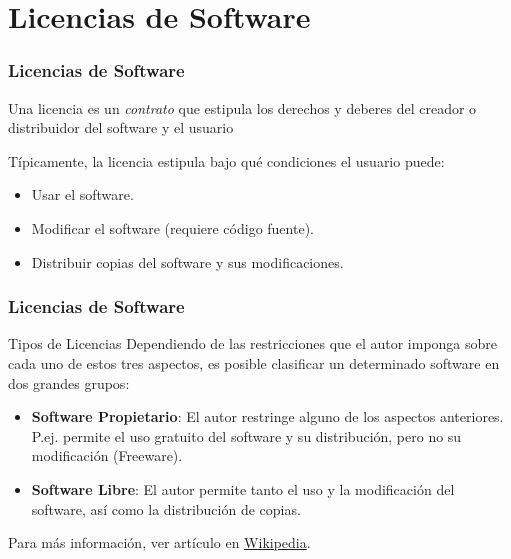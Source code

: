 \documentclass[aspectratio=169]{beamer}
\begin{document}
\section{Licencias de Software}
\begin{frame}[fragile]\frametitle{Licencias de Software}
\begin{block}{}
Una licencia es un \textit{contrato} que estipula los derechos y deberes del creador o distribuidor del software y el usuario
\end{block}
\begin{block}{}
Típicamente, la licencia estipula bajo qué condiciones el usuario puede:
\begin{itemize}
\item Usar el software.
\item Modificar el software (requiere código fuente).
\item Distribuir copias del software y sus modificaciones.
\end{itemize}
\end{block}
\end{frame}

\begin{frame}
\frametitle{Licencias de Software}
\begin{block}{Tipos de Licencias}
Dependiendo de las restricciones que el autor imponga sobre cada uno de estos tres aspectos, es posible clasificar un determinado software en dos grandes grupos:
\begin{itemize}
\item \textbf{Software Propietario}: El autor restringe alguno de los aspectos anteriores. P.ej. permite el uso gratuito del software y su distribución, pero no su modificación (Freeware).
\item \textbf{Software Libre}: El autor permite tanto el uso y la modificación del software, así como la distribución de copias.
\end{itemize}
\end{block}
Para más información, ver artículo en \href{https://es.wikipedia.org/wiki/Licencia_de_software}{Wikipedia}.
\end{frame}
\end{document}

